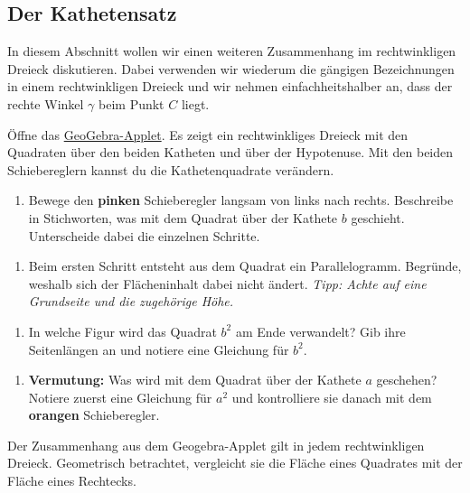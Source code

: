 \documentclass[11pt,oneside]{article}
\begin{document}
\subsection{Der Kathetensatz}
	In diesem Abschnitt wollen wir einen weiteren Zusammenhang im rechtwinkligen Dreieck diskutieren. Dabei verwenden wir wiederum die gängigen Bezeichnungen in einem rechtwinkligen Dreieck und wir nehmen einfachheitshalber an, dass der rechte Winkel $\gamma$ beim Punkt $C$ liegt.
	\begin{aufgabe}
		Öffne das \href{https://www.geogebra.org/m/a4ss2vsq}{GeoGebra-Applet}\footnotemark. Es zeigt ein rechtwinkliges Dreieck mit den Quadraten über den beiden Katheten und über der Hypotenuse. Mit den beiden Schiebereglern kannst du die Kathetenquadrate verändern.
		\begin{enumerate}[label=\alph*)]
			\item Bewege den \textcolor{mypink}{\textbf{pinken}} Schieberegler langsam von links nach rechts. Beschreibe in Stichworten, was mit dem Quadrat über der Kathete $b$ geschieht. Unterscheide dabei die einzelnen Schritte.
		\end{enumerate}
		\begin{enumerate}[label=\alph*), resume]
		\item Beim ersten Schritt entsteht aus dem Quadrat ein Parallelogramm. Begründe, weshalb sich der Flächeninhalt dabei nicht ändert. \textit{Tipp: Achte auf eine Grundseite und die zugehörige Höhe.}
		\end{enumerate}
		\begin{enumerate}[label=\alph*), resume]
		\item In welche Figur wird das Quadrat $b^2$ am Ende verwandelt? Gib ihre Seitenlängen an und notiere eine Gleichung für $b^2$.
		\end{enumerate}
		\begin{enumerate}[label=\alph*), resume]
		\item {\bf Vermutung:} Was wird mit dem Quadrat über der Kathete $a$ geschehen? Notiere zuerst eine Gleichung für $a^2$ und kontrolliere sie danach mit dem \textcolor{myorange}{\textbf{orangen}} Schieberegler.
		\end{enumerate}
	\end{aufgabe}
	Der Zusammenhang aus dem Geogebra-Applet gilt in jedem rechtwinkligen Dreieck. Geometrisch betrachtet, vergleicht sie die Fläche eines Quadrates mit der Fläche eines Rechtecks.
\end{document}
